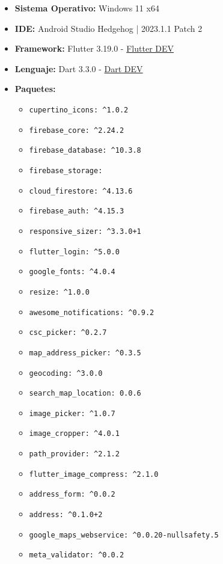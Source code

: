 \documentclass[a4paper, 12pt]{article}
\begin{document}
\begin{itemize}[noitemsep]
	\item \textbf{Sistema Operativo:} Windows 11 x64
	\item \textbf{IDE:} Android Studio Hedgehog | 2023.1.1 Patch 2
	\item \textbf{Framework:} Flutter 3.19.0 -  \href{https://flutter.dev/6}{Flutter DEV} \cite{flutter_dev}
	\item \textbf{Lenguaje:} Dart 3.3.0 - \href{https://dart.dev/}{Dart DEV} \cite{dart_dev}
	\item \textbf{Paquetes:}
		\begin{itemize}[noitemsep]
		  \item \texttt{cupertino\_icons: \^{}1.0.2}
		  \item \texttt{firebase\_core: \^{}2.24.2}
		  \item \texttt{firebase\_database: \^{}10.3.8}
		  \item \texttt{firebase\_storage:}
		  \item \texttt{cloud\_firestore: \^{}4.13.6}
		  \item \texttt{firebase\_auth: \^{}4.15.3}
		  \item \texttt{responsive\_sizer: \^{}3.3.0+1}
		  \item \texttt{flutter\_login: \^{}5.0.0}
		  \item \texttt{google\_fonts: \^{}4.0.4}
		  \item \texttt{resize: \^{}1.0.0}
		  \item \texttt{awesome\_notifications: \^{}0.9.2}
		  \item \texttt{csc\_picker: \^{}0.2.7}
		  \item \texttt{map\_address\_picker: \^{}0.3.5}
		  \item \texttt{geocoding: \^{}3.0.0}
		  \item \texttt{search\_map\_location: 0.0.6}
		  \item \texttt{image\_picker: \^{}1.0.7}
		  \item \texttt{image\_cropper: \^{}4.0.1}
		  \item \texttt{path\_provider: \^{}2.1.2}
		  \item \texttt{flutter\_image\_compress: \^{}2.1.0}
		  \item \texttt{address\_form: \^{}0.0.2}
		  \item \texttt{address: \^{}0.1.0+2}
		  \item \texttt{google\_maps\_webservice: \^{}0.0.20-nullsafety.5}
		  \item \texttt{meta\_validator: \^{}0.0.2}

\end{itemize}
\end{itemize}
\end{document}
